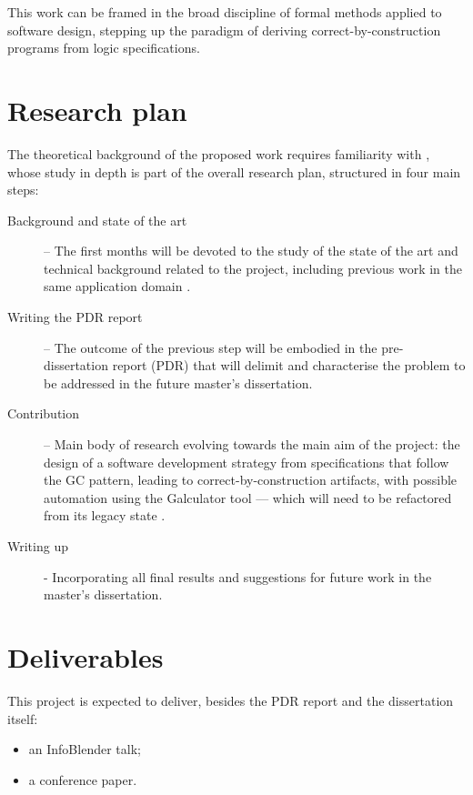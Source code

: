 \documentclass[a4paper, 11pt]{article} %
\begin{document}
This work can be framed in the broad discipline of formal methods applied to
software design, stepping up the paradigm of deriving correct-by-construction
programs from logic specifications.


\section*{Research plan}

The theoretical background of the proposed work requires familiarity with
\cite{BM97,Ba04a,Ol20}, whose study in depth is part of
the overall research plan, structured in four main steps:

\begin{description}

\item[Background and state of the art] -- The first months will be devoted
to the study of the state of the art and technical background related to
the project, including previous work in the same application domain \cite{SO08}.

\item[Writing the PDR report] -- The outcome of the previous step will be
embodied in the pre-dissertation report (PDR) that will delimit and characterise
the problem to be addressed in the future master’s dissertation.

\item[Contribution] -- Main body of research evolving towards the main aim of the
project: the design of a software development strategy from specifications 
that follow the GC pattern, leading to correct-by-construction
artifacts, with possible automation using the Galculator tool --- which will need to
be refactored from its legacy state \cite{SO08}.

\item[Writing up] - Incorporating all final results and suggestions for future
work in the master's dissertation.
\end{description}


\section*{Deliverables}

This project is expected to deliver, besides the PDR report and the dissertation itself:
\begin{itemize}
\item   an InfoBlender talk;
\item   a conference paper.
\end{itemize}
\end{document}
